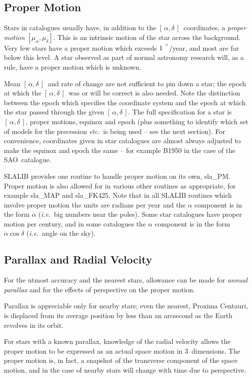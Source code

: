 \documentclass[11pt,twoside,nolof]{starlink}
\providecommand{\radec}     {$[\,\alpha,\delta\,]$}
\providecommand{\arcseci}[1] {$#1\hspace{-0.05em}$\raisebox{-0.5ex}
                         {$^{'\hspace{-0.1em}'}$}}
\begin{document}
\subsection{Proper Motion}
Stars in catalogues usually have, in addition to the
\radec\  coordinates, a \textit{proper motion} $[\mu_\alpha,\mu_\delta]$.
This is an intrinsic motion
of the star across the background.  Very few stars have a
proper motion which exceeds \arcseci{1}/year, and most are
far below this level.  A star observed as part of normal
astronomy research will, as a rule, have a proper motion
which is unknown.

Mean \radec\ and rate of change are not sufficient to pin
down a star;  the epoch at which the \radec\ was or will
be correct is also needed.  Note the distinction
between the epoch which specifies the
coordinate system and the epoch at which the star passed
through the given \radec.  The full specification for a star
is \radec, proper motions, equinox and epoch (plus something to
identify which set of models for the precession \textit{etc.}\ is
being used -- see the next section).
For convenience, coordinates given in star catalogues are almost
always adjusted to make the equinox and epoch the same -- for
example B1950 in the case of the SAO~catalogue.

SLALIB provides one routine to handle proper motion on its own,
sla\_PM.
Proper motion is also allowed for in various other
routines as appropriate, for example
sla\_MAP
and
sla\_FK425.
Note that in all SLALIB routines which involve proper motion
the units are radians per year and the
$\alpha$ component is in the form $\dot{\alpha}$ (\textit{i.e.}\ big
numbers near the poles).
Some star catalogues have proper motion per century, and
in some catalogues the $\alpha$ component is in the form
$\dot{\alpha}\cos\delta$ (\textit{i.e.}\ angle on the sky).

\subsection{Parallax and Radial Velocity}
For the utmost accuracy and the nearest stars, allowance can
be made for \textit{annual parallax}\/ and for the effects of perspective
on the proper motion.

Parallax is appreciable only for nearby stars;  even
the nearest, Proxima Centauri, is displaced from its average
position by less than
an arcsecond as the Earth revolves in its orbit.

For stars with a known parallax, knowledge of the radial velocity
allows the proper motion to be expressed as an actual space
motion in 3~dimensions.  The proper motion is,
in fact, a snapshot of the transverse component of the
space motion, and in the case of nearby stars will
change with time due to perspective.
\end{document}
